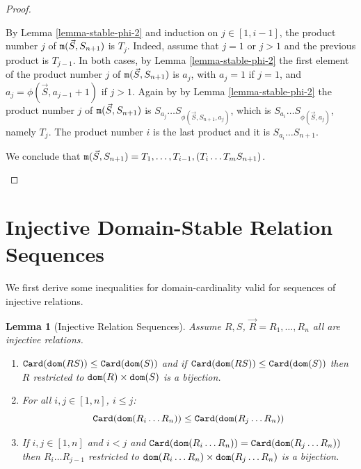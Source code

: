 \documentclass{lmcs}
\newtheorem{lemma}[theorem]{Lemma}
\begin{document}
\begin{proof}
\begin{enumerate}
\begin{enumerate}
By Lemma \ref{lemma-stable-phi-2} and induction on $j \in [1,i-1]$,
the product number $j$ of ${\tt m}(\vec{S},S_{n+1})$ is $T_j$.
Indeed, assume that $j=1$ or $j>1$ and the previous product is $T_{j-1}$.
In both cases, by Lemma \ref{lemma-stable-phi-2} the first element
of the product number $j$ of ${\tt m}(\vec{S},S_{n+1})$
is $a_j$, with $a_j = 1$ if $j=1$, and $a_j = \phi(\vec{S},a_ {j-1}+1)$ if $j>1$. 
Again by by Lemma \ref{lemma-stable-phi-2} the product number $j$ 
of ${\tt m}(\vec{S},S_{n+1})$ is $S_{a_j} \ldots S_{\phi(\vec{S},S_{n+1},a_j)}$, 
which is $S_{a_i} \ldots S_{\phi(\vec{S},a_j)}$, namely $T_j$.
The product number $i$ is the last product and it is $S_{a_i} \ldots S_{n+1}$.

We conclude that 
${\tt m}(\vec{S}, S_{n+1}) = T_1, \ldots, T_{i-1}, (T_i \ldots T_m S_{n+1})$.
\end{enumerate}
\end{enumerate}
\end{proof}



\newpage   \section{Injective Domain-Stable Relation Sequences}

We first derive some inequalities for domain-cardinality
valid for sequences of injective relations.

\begin{lemma}[Injective Relation Sequences]
\label{lemma-stable-sequences}
Assume $R, S$, $\vec{R}=R_1, \ldots, R_n$ all are \emph{injective} relations.
\begin{enumerate}
\item
${\tt Card}({\tt dom}(RS)) \le {\tt Card}({\tt dom}(S))$
and if ${\tt Card}({\tt dom}(RS)) \le {\tt Card}({\tt dom}(S))$ then $R$ restricted to ${\tt dom}(R) \times {\tt dom}(S)$
is a bijection.

\item
For all $i,j \in [1,n]$, $i \le j$:
$$
{\tt Card}({\tt dom}(R_i \ldots R_n)) \le {\tt Card}({\tt dom}(R_j \ldots R_n))
$$

\item
If  $i, j \in[1,n]$ and $i < j$ and ${\tt Card}({\tt dom}(R_i \ldots R_n)) = {\tt Card}({\tt dom}(R_j \ldots R_n))$
then $R_i \ldots R_{j-1}$ restricted to ${\tt dom}(R_i \ldots R_n) \times {\tt dom}(R_j \ldots R_n)$
is a bijection.
\end{enumerate}
\end{lemma}
\end{document}

